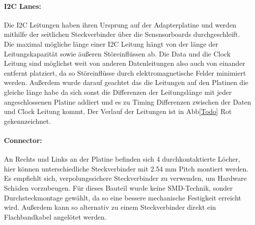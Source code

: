 \paragraph{I2C Lanes:}
Die I2C Leitungen haben ihren Ursprung auf der Adapterplatine und werden mithilfe der seitlichen Steckverbinder über die Sensnsorboards durchgeschleift.
Die maximal mögliche länge einer I2C Leitung hängt von der länge der Leitungskapazität sowie äußeren Störeinflüssen ab.
Die Data und die Clock Leitung sind möglichst weit von anderen Datenleitungen  also auch von einander entfernt platziert, da so Störeinflüsse durch elektromagnetische Felder minimiert werden.
Außerdem wurde darauf geachtet das die Leitungen auf den Platinen die gleiche länge habe da sich sonst die Differenzen der Leitungslänge mit jeder angeschlossenen Platine addiert und es zu Timing Differenzen zwischen der Daten und Clock Leitung kommt.
Der Verlauf der Leitungen ist in Abb\ref{Todo} Rot gekennzeichnet.

\paragraph{Connector:} An Rechts und Links an der Platine befinden sich 4 durchkontaktierte Löcher, hier können unterschiedliche Steckverbinder mit 2.54 mm Pitch montiert werden.
	Es empfiehlt sich, verpolungssichere Steckverbinder zu verwenden, um Hardware Schäden vorzubeugen.
	Für dieses Bauteil wurde keine SMD-Technik, sonder Durchsteckmontage gewählt, da so eine bessere mechanische Festigkeit erreicht wird.
	Außerdem kann so alternativ zu einem Steckverbinder direkt ein Flachbandkabel angelötet werden.

